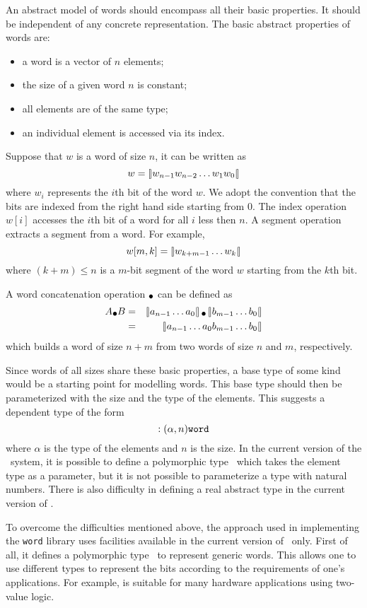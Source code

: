 An abstract model of words should encompass all their basic
properties. It should be independent of any concrete representation.
The basic abstract properties of words are:
\begin{itemize}
\item a word is a vector of $n$ elements;
\item the size of a given word $n$ is constant;
\item all elements are of the same type;
\item an individual element is accessed via its index.
\end{itemize}
Suppose that $w$ is a word of size $n$, it can be written as
\[
w = \left[\mkern-2.5mu\left|w_{n-1} w_{n-2} \ldots w_1 w_0\right|\mkern-2mu\right]
\]
where $w_i$ represents the $i$th bit of the word $w$.
We adopt the convention that the bits are indexed from the right hand
side starting from 0. The index operation $w[i]$ accesses the $i$th
bit of a word for all $i$ less then $n$. A segment operation extracts a
segment from a word. For example,
\begin{equation}
w[m,k] = \left[\mkern-2.5mu\left|w_{k + m -1} \ldots w_k\right|\mkern-2mu\right]\label{eq-seg}
\end{equation}
where $(k + m) \leq n$ is a $m$-bit segment of the word $w$ starting
from the $k$th bit.

A word concatenation operation $\wcat$ can be defined as
\begin{eqnarray}
A \wcat B & = & \nword{a_{n-1}\ldots a_0} \wcat \nword{b_{m-1}\ldots b_0}\\ \nonumber
          & = & \nword{a_{n-1}\ldots a_0 b_{m-1}\ldots b_0} \label{eq-wordct}
\end{eqnarray}
which builds a word of size $n + m$ from two words of size $n$ and
$m$, respectively.

Since words of all sizes share these basic properties, a base type of
some kind would be a starting point for modelling words. This base
type should then be parameterized with the size and the type of the
elements.  This suggests a dependent type of the form
\[:(\alpha, n)\mbox{\tt word} \]
where $\alpha$ is the type of the elements and $n$ is the size.
In the current version of the \HOL\ system, it is possible to define a
polymorphic type \word{$\alpha$}\ which takes the element type as a
parameter, but it is not possible to parameterize a type with natural numbers.
There is also difficulty in defining a real abstract type in the current
version of \HOL.

To overcome the difficulties mentioned above, the approach used in
implementing the {\tt word} library  uses  facilities available in the
current version of \HOL\ only. First of all, it defines a polymorphic
type \word{*}\ to represent generic words. This allows one to use
different types to represent the bits according to the requirements of
one's  applications. For example,  is suitable for many hardware
applications using two-value logic.

